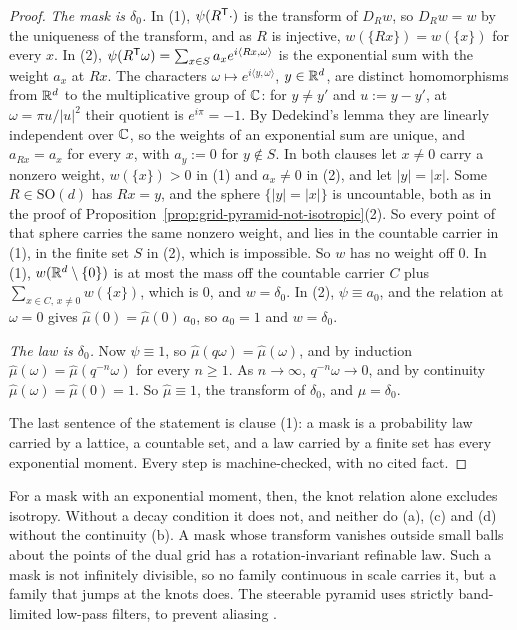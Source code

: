 \begin{proof}
\emph{The mask is $\delta_0$.} In (1), $\psi(R^{\mathsf{T}}\cdot)$ is the transform of $D_Rw$, so
$D_Rw = w$ by the uniqueness of the transform, and as $R$ is injective, $w(\{Rx\}) = w(\{x\})$ for
every $x$. In (2), $\psi(R^{\mathsf{T}}\omega) = \sum_{x \in S}a_xe^{i\langle Rx, \omega\rangle}$ is the
exponential sum with the weight $a_x$ at $Rx$. The characters $\omega \mapsto
e^{i\langle y, \omega\rangle}$, $y \in \mathbb{R}^d$, are distinct homomorphisms from $\mathbb{R}^d$ to the
multiplicative group of $\mathbb{C}$: for $y \ne y'$ and $u := y - y'$, at $\omega = \pi u/|u|^2$ their
quotient is $e^{i\pi} = -1$. By Dedekind's lemma they are linearly independent over $\mathbb{C}$, so the
weights of an exponential sum are unique, and $a_{Rx} = a_x$ for every $x$, with $a_y := 0$ for
$y \notin S$. In both clauses let $x \ne 0$ carry a nonzero weight, $w(\{x\}) > 0$ in (1) and
$a_x \ne 0$ in (2), and let $|y| = |x|$. Some $R \in \mathrm{SO}(d)$ has $Rx = y$, and the sphere
$\{|y| = |x|\}$ is uncountable, both as in the proof of
Proposition~\ref{prop:grid-pyramid-not-isotropic}(2). So every point of that sphere carries the
same nonzero weight, and lies in the countable carrier in (1), in the finite set $S$ in (2), which
is impossible. So $w$ has no weight off $0$. In (1), $w(\mathbb{R}^d \setminus \{0\})$ is at most the mass
off the countable carrier $C$ plus $\sum_{x \in C,\,x \ne 0}w(\{x\})$, which is $0$, and
$w = \delta_0$. In (2), $\psi \equiv a_0$, and the relation at $\omega = 0$ gives
$\widehat\mu(0) = \widehat\mu(0)\,a_0$, so $a_0 = 1$ and $w = \delta_0$.

\emph{The law is $\delta_0$.} Now $\psi \equiv 1$, so $\widehat\mu(q\omega) =
\widehat\mu(\omega)$, and by induction $\widehat\mu(\omega) = \widehat\mu(q^{-n}\omega)$ for every
$n \ge 1$. As $n \to \infty$, $q^{-n}\omega \to 0$, and by continuity $\widehat\mu(\omega) =
\widehat\mu(0) = 1$. So $\widehat\mu \equiv 1$, the transform of $\delta_0$, and $\mu = \delta_0$.

The last sentence of the statement is clause (1): a mask is a probability law carried by a lattice,
a countable set, and a law carried by a finite set has every exponential moment. Every step is
machine-checked, with no cited fact.
\end{proof}

For a mask with an exponential moment, then, the knot relation alone excludes isotropy. Without a
decay condition it does not, and neither do (a), (c) and (d) without the continuity (b). A mask whose
transform vanishes outside small balls about the points of the dual grid has a rotation-invariant
refinable law. Such a mask is not infinitely divisible, so no family continuous in scale carries
it, but a family that jumps at the knots does. The steerable pyramid uses strictly band-limited
low-pass filters, to prevent aliasing \cite[p.~445]{simoncelli1995steerable}.

